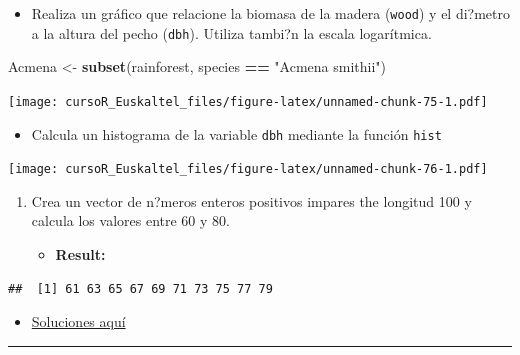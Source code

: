 \documentclass[]{book}
\newenvironment{Shaded}{\begin{snugshade}}{\end{snugshade}}
\newcommand{\KeywordTok}[1]{\textcolor[rgb]{0.13,0.29,0.53}{\textbf{#1}}}
\newcommand{\StringTok}[1]{\textcolor[rgb]{0.31,0.60,0.02}{#1}}
\newcommand{\OperatorTok}[1]{\textcolor[rgb]{0.81,0.36,0.00}{\textbf{#1}}}
\newcommand{\NormalTok}[1]{#1}
\providecommand{\tightlist}{%
  \setlength{\itemsep}{0pt}\setlength{\parskip}{0pt}}
\begin{document}
\begin{itemize}
\tightlist
\item
  Realiza un gráfico que relacione la biomasa de la madera
  (\texttt{wood}) y el di?metro a la altura del pecho (\texttt{dbh}).
  Utiliza tambi?n la escala logarítmica.
\end{itemize}

\begin{Shaded}
\begin{Highlighting}[]
\NormalTok{Acmena <-}\StringTok{ }\KeywordTok{subset}\NormalTok{(rainforest, species }\OperatorTok{==}\StringTok{ "Acmena smithii"}\NormalTok{)}
\end{Highlighting}
\end{Shaded}

\texttt{[image: cursoR\_Euskaltel\_files/figure-latex/unnamed-chunk-75-1.pdf]}

\begin{itemize}
\tightlist
\item
  Calcula un histograma de la variable \texttt{dbh} mediante la función
  \texttt{hist}
\end{itemize}

\texttt{[image: cursoR\_Euskaltel\_files/figure-latex/unnamed-chunk-76-1.pdf]}

\begin{enumerate}
\def\labelenumi{\arabic{enumi}.}
\setcounter{enumi}{3}
\item
  Crea un vector de n?meros enteros positivos impares the longitud 100 y
  calcula los valores entre 60 y 80.

  \begin{itemize}
  \tightlist
  \item
    \textbf{Result:}
  \end{itemize}
\end{enumerate}

\begin{verbatim}
##  [1] 61 63 65 67 69 71 73 75 77 79
\end{verbatim}

\begin{itemize}
\tightlist
\item
  \href{http://idaejin.github.io/bcam-courses/rbasics/rbasics_sol.R}{Soluciones
  aquí}
\end{itemize}

\begin{center}\rule{0.5\linewidth}{\linethickness}\end{center}
\end{document}
